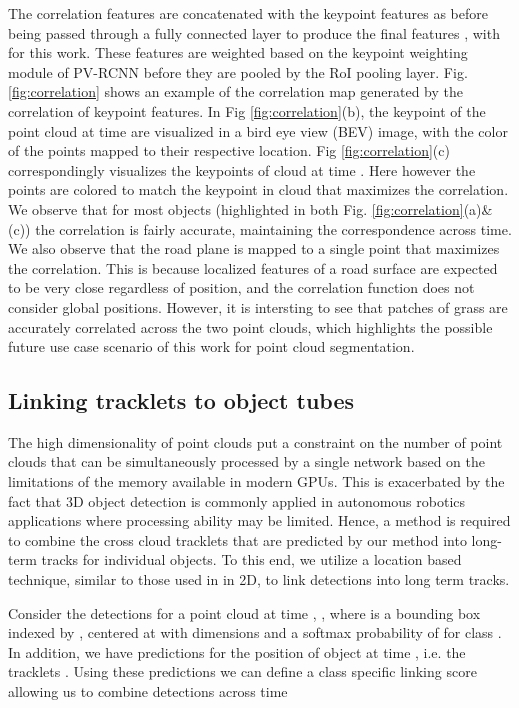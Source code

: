 \documentclass[10pt,twocolumn,letterpaper]{article}
\begin{document}
The correlation features are concatenated with the keypoint features as  before being passed through a fully connected layer to produce the final features , with  for this work. These features are weighted based on the keypoint weighting module of PV-RCNN before they are pooled by the RoI pooling layer. Fig. \ref{fig:correlation} shows an example of the correlation map generated by the correlation of keypoint features. In Fig \ref{fig:correlation}(b), the keypoint of the point cloud at time  are visualized in a bird eye view (BEV) image, with the color of the points mapped to their respective  location. Fig \ref{fig:correlation}(c) correspondingly visualizes the keypoints of cloud at time . Here however the points are colored to match the keypoint in cloud  that maximizes the correlation. We observe that for most objects (highlighted in both Fig. \ref{fig:correlation}(a)\&(c)) the correlation is fairly accurate, maintaining the correspondence across time. We also observe that the road plane is mapped to a single point that maximizes the correlation. This is because localized features of a road surface are expected to be very close regardless of position, and the correlation function does not consider global positions. However, it is intersting to see that patches of grass are accurately correlated across the two point clouds, which highlights the possible future use case scenario of this work for point cloud segmentation.

\subsection{Linking tracklets to object tubes}\label{sec:method:tracklets_to_tubes}
The high dimensionality of point clouds put a constraint on the number of point clouds that can be simultaneously processed by a single network based on the limitations of the memory available in modern GPUs. This is exacerbated by the fact that 3D object detection is commonly applied in autonomous robotics applications where processing ability may be limited. Hence, a method is required to combine the cross cloud tracklets that are predicted by our method into long-term tracks for individual objects. To this end, we utilize a location based technique, similar to those used in \cite{Feichtenhofer2017,Han2016} in 2D, to link detections into long term tracks.

Consider the detections for a point cloud at time , , where  is a bounding box indexed by , centered at  with dimensions  and a softmax probability of  for class . In addition, we have predictions for the position of object  at time , i.e. the tracklets . Using these predictions we can define a class specific linking score allowing us to combine detections across time
\end{document}
